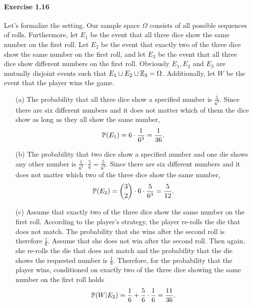 \paragraph{Exercise 1.16} Let's formalize the setting. Our sample space $\Omega$
consists of all possible sequences of rolls. Furthermore, let $E_1$ be the event
that all three dice show the same number on the first roll. Let $E_2$ be the event
that exactly two of the three dice show the same number on the first roll, and let
$E_3$ be the event that all three dice show different numbers on the first roll.
Obviously $E_1, E_2$ and $E_3$ are mutually disjoint events such that
$E_1 \cup E_2 \cup \mathbb{E}_3 = \Omega$. Additionally, let $W$ be the event that the
player wins the game.
\begin{enumerate}
  \item[(a)] The probability that all three dice show a specified number is
    $\frac{1}{6^3}$. Since there are six different numbers and it does not matter
    which of them the dice show as long as they all show the same number,
    \[ \mathbb{P}(E_1) = 6 \cdot \frac{1}{6^3} = \frac{1}{36}.\]

  \item[(b)] The probability that two dice show a specified number and one die
    shows any other number is $\frac{1}{6^2} \cdot \frac{5}{6} = \frac{5}{6^3}$.
    Since there are six different numbers and it does not matter which two of the
    three dice show the same number,
    \[ \mathbb{P}(E_2) = \binom{3}{2} \cdot 6 \cdot \frac{5}{6^3} = \frac{5}{12}.\]

  \item[(c)] Assume that exactly two of the three dice show the same number on
    the first roll. According to the player's strategy, the player re-rolls the
    die that does not match. The probability that she wins after the second roll
    is therefore $\frac{1}{6}$. Assume that she does not win after the second roll.
    Then again, she re-rolls the die that does not match and the probability that
    the die shows the requested number is $\frac{1}{6}$. Therefore, for the
    probability that the player wins, conditioned on exactly two of the three dice
    showing the same number on the first roll holds
    \[ \mathbb{P}(W|E_2) =\frac{1}{6} + \frac{5}{6} \cdot \frac{1}{6} = \frac{11}{36}. \]


\end{enumerate}
